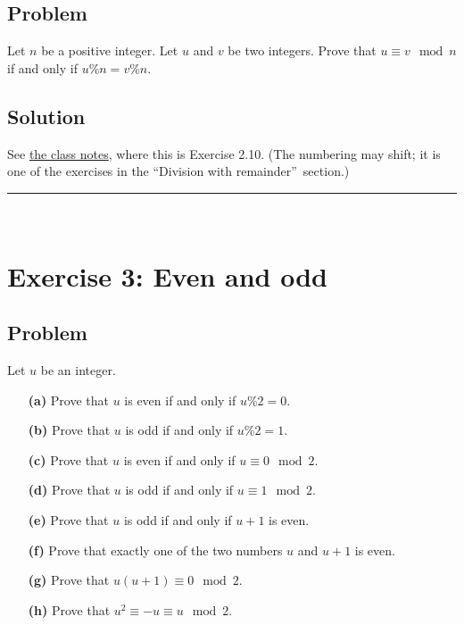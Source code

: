 \documentclass[paper=a4, fontsize=12pt]{scrartcl}%
\theoremstyle{plainsl}
\theoremstyle{definition}
\theoremstyle{remark}
\begin{document}
\subsection{Problem}

Let $n$ be a positive integer. Let $u$ and $v$ be two integers. Prove that
$u\equiv v\mod n$ if and only if $u\%n=v\%n$.

\subsection{Solution}

See \href{http://www-users.math.umn.edu/~dgrinber/19s/notes.pdf}{the class
notes}, where this is Exercise 2.10. (The numbering may shift; it is one of
the exercises in the \textquotedblleft Division with
remainder\textquotedblright\ section.)

\rule{\linewidth}{0.3pt} \\[0.4cm]

\section{Exercise 3: Even and odd}

\subsection{Problem}

Let $u$ be an integer.

\begin{enumerate}
\item[\textbf{(a)}] Prove that $u$ is even if and only if $u \% 2 = 0$.

\item[\textbf{(b)}] Prove that $u$ is odd if and only if $u \% 2 = 1$.

\item[\textbf{(c)}] Prove that $u$ is even if and only if $u \equiv0 \mod 2$.

\item[\textbf{(d)}] Prove that $u$ is odd if and only if $u \equiv1 \mod 2$.

\item[\textbf{(e)}] Prove that $u$ is odd if and only if $u + 1$ is even.

\item[\textbf{(f)}] Prove that exactly one of the two numbers $u$ and $u + 1$
is even.

\item[\textbf{(g)}] Prove that $u \left(  u+1 \right)  \equiv0 \mod 2$.

\item[\textbf{(h)}] Prove that $u^{2} \equiv-u \equiv u \mod 2$.
\end{enumerate}
\end{document}
